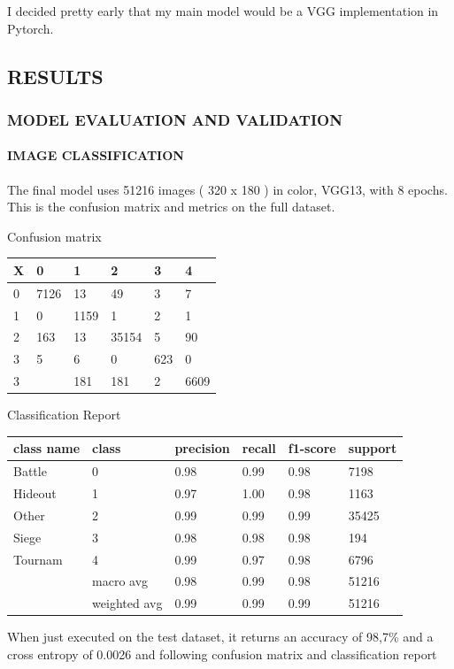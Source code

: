 \documentclass[
]{article}
\begin{document}
I decided pretty early that my main model would be a VGG implementation
in Pytorch.

\hypertarget{results}{%
\subsection{RESULTS}\label{results}}

\hypertarget{model-evaluation-and-validation}{%
\subsubsection{MODEL EVALUATION AND
VALIDATION}\label{model-evaluation-and-validation}}

\hypertarget{image-classification}{%
\paragraph{IMAGE CLASSIFICATION}\label{image-classification}}

The final model uses 51216 images ( 320 x 180 ) in color, VGG13, with 8
epochs. This is the confusion matrix and metrics on the full dataset.

Confusion matrix

\begin{longtable}[]{@{}llllll@{}}
\toprule
X & 0 & 1 & 2 & 3 & 4\tabularnewline
\midrule
\endhead
0 & 7126 & 13 & 49 & 3 & 7\tabularnewline
1 & 0 & 1159 & 1 & 2 & 1\tabularnewline
2 & 163 & 13 & 35154 & 5 & 90\tabularnewline
3 & 5 & 6 & 0 & 623 & 0\tabularnewline
3 & & 181 & 181 & 2 & 6609\tabularnewline
\bottomrule
\end{longtable}

Classification Report

\begin{longtable}[]{@{}llllll@{}}
\toprule
class name & class & precision & recall & f1-score &
support\tabularnewline
\midrule
\endhead
Battle & 0 & 0.98 & 0.99 & 0.98 & 7198\tabularnewline
Hideout & 1 & 0.97 & 1.00 & 0.98 & 1163\tabularnewline
Other & 2 & 0.99 & 0.99 & 0.99 & 35425\tabularnewline
Siege & 3 & 0.98 & 0.98 & 0.98 & 194\tabularnewline
Tournam & 4 & 0.99 & 0.97 & 0.98 & 6796\tabularnewline
& macro avg & 0.98 & 0.99 & 0.98 & 51216\tabularnewline
& weighted avg & 0.99 & 0.99 & 0.99 & 51216\tabularnewline
\bottomrule
\end{longtable}

When just executed on the test dataset, it returns an accuracy of 98,7\%
and a cross entropy of 0.0026 and following confusion matrix and
classification report
\end{document}
